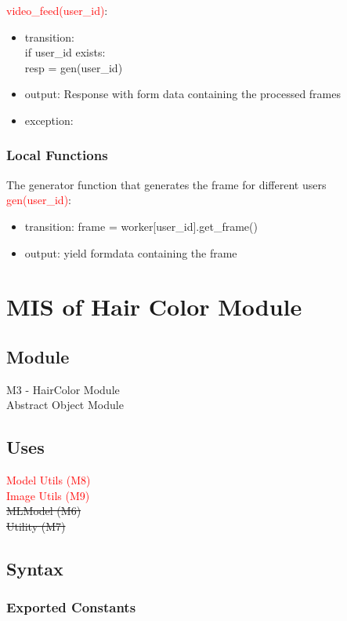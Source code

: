 \documentclass[12pt, titlepage]{article}
\begin{document}
\noindent \textcolor{red}{video\_feed(user\_id)}:
\begin{itemize}
\item transition: \\
if user\_id exists: \\
resp = gen(user\_id)
\item output: Response with form data containing the processed frames
\item exception: 
\end{itemize}

\subsubsection{Local Functions}
The generator function that generates the frame for different users\\ 
\textcolor{red}{gen(user\_id)}: 
\begin{itemize}
    \item transition: frame = worker[user\_id].get\_frame()
    \item output: yield formdata containing the frame
\end{itemize}
\color{black}

\newpage
\section{MIS of Hair Color Module}
\subsection{Module}
M3 - HairColor Module\\
Abstract Object Module

\subsection{Uses}
\textcolor{red}{Model Utils (M8)} \\
\textcolor{red}{Image Utils (M9)} \\
\sout{MLModel (M6)} \\
\sout{Utility (M7)}

\subsection{Syntax}

\subsubsection{Exported Constants}
\end{document}
